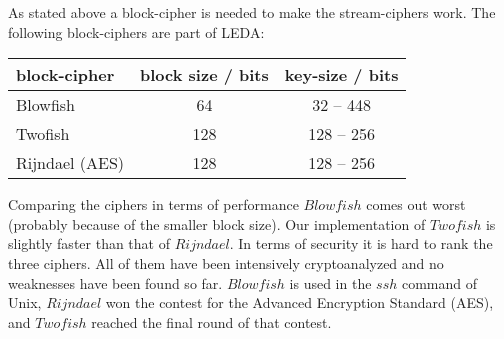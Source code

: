 As stated above a block-cipher is needed to make the stream-ciphers work. 
The following block-ciphers are part of LEDA:
\begin{center}
\begin{tabular}{|l|c|c|}
\hline
block-cipher   & block size / bits & key-size / bits \\
\hline
Blowfish       &  64               & 32 -- 448 \\
Twofish        & 128               & 128 -- 256 \\
Rijndael (AES) & 128               & 128 -- 256 \\
\hline
\end{tabular}
\end{center}

Comparing the ciphers in terms of performance $\mathit{Blowfish}$ comes out 
worst (probably because of the smaller block size). Our implementation of 
$\mathit{Twofish}$ is slightly faster than that of $\mathit{Rijndael}$. 
In terms of security it is hard to rank the three ciphers. All of them have
been intensively cryptoanalyzed and no weaknesses have been found so far. 
$\mathit{Blowfish}$ is used in the $\mathit{ssh}$ command of Unix, 
$\mathit{Rijndael}$ won the contest for the Advanced Encryption Standard (AES),
and $\mathit{Twofish}$ reached the final round of that contest.

\newpage


\newpage


\newpage


\newpage

